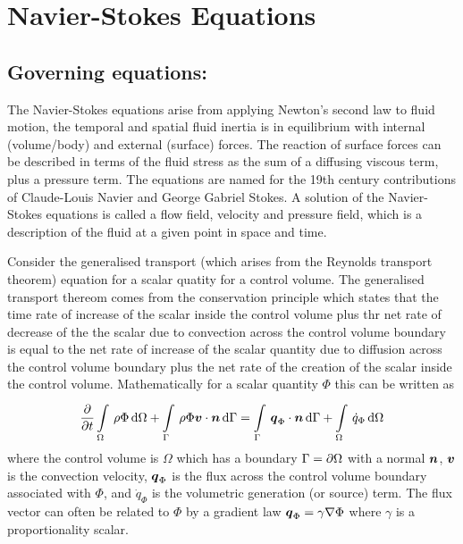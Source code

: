 \section{Navier-Stokes Equations}
\label{sec:NavierStokesEquations}

\subsection{Governing equations:}

The Navier-Stokes equations arise from applying Newton's second law to fluid
motion, \ie the temporal and spatial fluid inertia is in equilibrium with
internal (volume/body) and external (surface) forces. The reaction of surface
forces can be described in terms of the fluid stress as the sum of a diffusing
viscous term, plus a pressure term. The equations are named for the 19th
century contributions of Claude-Louis Navier and George Gabriel Stokes. A
solution of the Navier-Stokes equations is called a flow field, \ie velocity
and pressure field, which is a description of the fluid at a given point in
space and time.

Consider the generalised transport (which arises from the Reynolds transport
theorem) equation for a scalar quatity for a control volume. The generalised
transport thereom comes from the conservation principle which states that the
time rate of increase of the scalar inside the control volume plus thr net rate
of decrease of the the scalar due to convection across the control volume
boundary is equal to the net rate of increase of the scalar quantity due to
diffusion across the control volume boundary plus the net rate of the creation
of the scalar inside the control volume. Mathematically for a scalar quantity
$\Phi$ this can be written as
\begin{equation}
  \delby{}{t}\gint{\Omega}{}{\rho\Phi}{\Omega}+\gint{\Gamma}{}{\dotprod{\rho\Phi\vectr{v}}{\vectr{n}}}{\Gamma}=
  \gint{\Gamma}{}{\dotprod{\vectr{q}_{\Phi}}{\vectr{n}}}{\Gamma}+\gint{\Omega}{}{\dot{q}_{\Phi}}{\Omega}
  \label{eqn:integralgenscalartransport}
\end{equation}
where the control volume is $\Omega$ which has a boundary
$\Gamma= \partial{\Omega} $ with a normal $ \boldsymbol{n} $, $ \boldsymbol{v} $ is the
convection velocity, $ \boldsymbol{q} _{\Phi}$ is the flux across the control volume
boundary associated with $\Phi$, and $\dot{q}_{\Phi}$ is the volumetric
generation (or source) term. The flux vector can often be related to $\Phi$ by
a gradient law \ie $\vectr{q}_{\Phi}=\gamma\gradient{}{\Phi}$ where $\gamma$
is a proportionality scalar.

